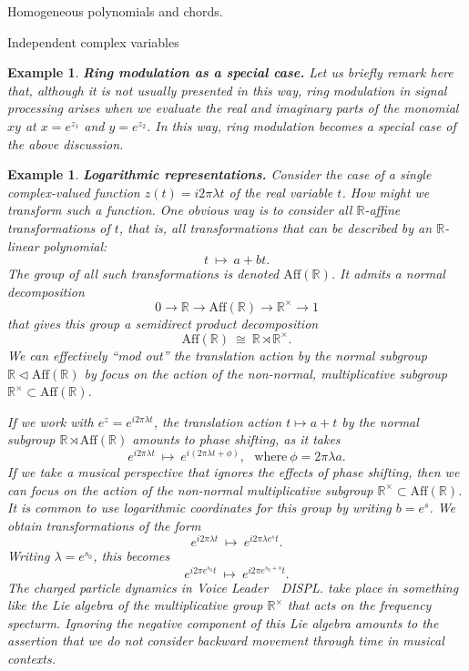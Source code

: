 \documentclass[letterpaper,11pt, reqno]{amsart}
\newtheorem{monodromy theorem}{Monodromy Theorem}[subsection]
\newtheorem{wild conjecture}[theorem]{Wild Conjecture}
\newtheorem{research objectives}{Research objectives}[subsection]
\newtheorem{research question}[theorem]{Research questions}
\newtheorem{aside question}[theorem]{Aside question}
\newtheorem{example}[theorem]{Example}
\newtheorem{audio example}[theorem]{\loudspeaker[3] Example}
\newtheorem{blank remark}[theorem]{}
\newtheorem{terminology and comment}[theorem]{Terminology and comment}
\newtheorem{purity hypothesis}[theorem]{Purity hypothesis}
\newtheorem{corollary of the purity hypothesis}[theorem]{Corollary of the purity hypothesis}
\newcommand{\RR} {{\mathbb R}}
\numberwithin{equation}{theorem}
\begin{document}
\begin{section}{Homogeneous polynomials and chords.}
\begin{subsection}{Independent complex variables}

\begin{example}
\normalfont
{\bf Ring modulation as a special case.}
Let us briefly remark here that, although it is not usually presented in this way, {\em ring modulation} in signal processing arises when we evaluate the real and imaginary parts of the monomial $xy$ at $x=e^{z_1}$ and $y=e^{z_2}$. In this way, ring modulation becomes a special case of the above discussion.
\end{example}

\begin{example}
\normalfont
{\bf Logarithmic representations.}
Consider the case of a single complex-valued function $z(t)=i2\pi\lambda t$ of the real variable $t$. How might we transform such a function. One obvious way is to consider all {\em $\RR$-affine transformations} of $t$, that is, all transformations that can be described by an $\RR$-linear polynomial:
	$$
	t
	\ \longmapsto\ 
	a+bt.
	$$
The group of all such transformations is denoted $\text{Aff}(\RR)$. It admits a normal decomposition
	$$
	0
	\longrightarrow
	\RR
	\longrightarrow
	\text{Aff}(\RR)
	\longrightarrow
	\RR^\times
	\longrightarrow
	1
	$$
that gives this group a semidirect product decomposition
	$$
	\text{Aff}(\RR)\ \cong\ \RR\rtimes\RR^\times.
	$$
We can effectively ``mod out'' the {\em translation} action by the normal subgroup $\RR\lhd\text{Aff}(\RR)$ by focus on the action of the non-normal, multiplicative subgroup $\RR^{\times}\subset\text{Aff}(\RR)$.

If we work with $e^{z}=e^{i2\pi\lambda t}$, the translation action $t\mapsto a+t$ by the normal subgroup $\mathbb{R}\rtimes\text{Aff}(\RR)$ amounts to phase shifting, as it takes
	$$
	e^{i2\pi\lambda t}
	\ \longmapsto\ 
	e^{i(2\pi\lambda t+\phi)},
	\ \ \ \text{where}\ 
	\phi=2\pi\lambda a.
	$$
If we take a musical perspective that ignores the effects of phase shifting, then we can focus on the action of the non-normal multiplicative subgroup $\RR^\times\subset\text{Aff}(\RR)$. It is common to use logarithmic coordinates for this group by writing $b=e^{s}$. We obtain transformations of the form
	$$
	e^{i2\pi\lambda t}
	\ \longmapsto\ 
	e^{i2\pi\lambda e^s t}.
	$$
Writing $\lambda=e^{s_0}$, this becomes
	$$
	e^{i2\pi e^{s_0} t}
	\ \longmapsto\ 
	e^{i2\pi e^{s_0+s} t}.
	$$
The charged particle dynamics in {\em Voice Leader\ \textemdash\ DISPL.} take place in something like the Lie algebra of the multiplicative group $\RR^\times$ that acts on the frequency specturm. Ignoring the negative component of this Lie algebra amounts to the assertion that we do not consider backward movement through time in musical contexts.


\end{example}
\end{subsection}
\end{section}
\end{document}
